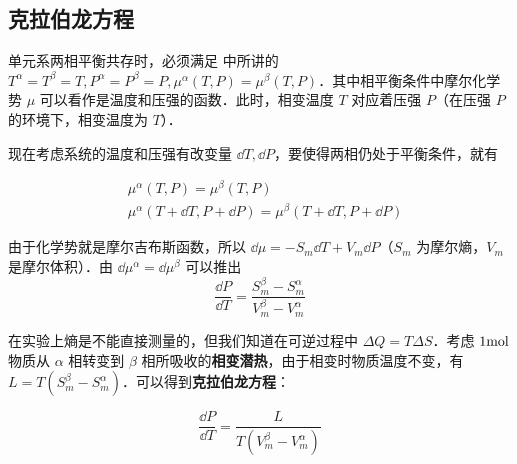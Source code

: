 
\begin{issues}
\issueDraft
\end{issues}


\subsection{克拉伯龙方程}
单元系两相平衡共存时，必须满足 中所讲的 $T^\alpha=T^\beta=T,P^\alpha=P^\beta=P,\mu^\alpha(T,P)=\mu^\beta(T,P)$．其中相平衡条件中摩尔化学势 $\mu$ 可以看作是温度和压强的函数．此时，相变温度 $T$ 对应着压强 $P$（在压强 $P$ 的环境下，相变温度为 $T$）．

现在考虑系统的温度和压强有改变量 $\dd T,\dd P$，要使得两相仍处于平衡条件，就有

\begin{align}
&\mu^\alpha(T,P)=\mu^\beta(T,P)\\
&\mu^\alpha(T+\dd T,P+\dd P)=\mu^\beta(T+\dd T,P+\dd P)
\end{align}

由于化学势就是摩尔吉布斯函数，所以 $\dd\mu=-S_m\dd T+V_m\dd P$（$S_m$ 为摩尔熵，$V_m$ 是摩尔体积）．由 $\dd \mu^\alpha=\dd \mu^\beta$ 可以推出
\begin{equation}
\frac{\dd P}{\dd T}=\frac{S^\beta_m-S^\alpha_m}{V^\beta_m-V^\alpha_m}
\end{equation}

在实验上熵是不能直接测量的，但我们知道在可逆过程中 $\Delta Q=T\Delta S$．考虑 $1\rm mol$ 物质从 $\alpha$ 相转变到 $\beta$ 相所吸收的\textbf{相变潜热}，由于相变时物质温度不变，有 $L=T(S_m^\beta-S_m^\alpha)$．可以得到\textbf{克拉伯龙方程}：

\begin{equation}
\frac{\dd P}{\dd T}=\frac{L}{T(V^\beta_m-V^\alpha_m)}
\end{equation}
